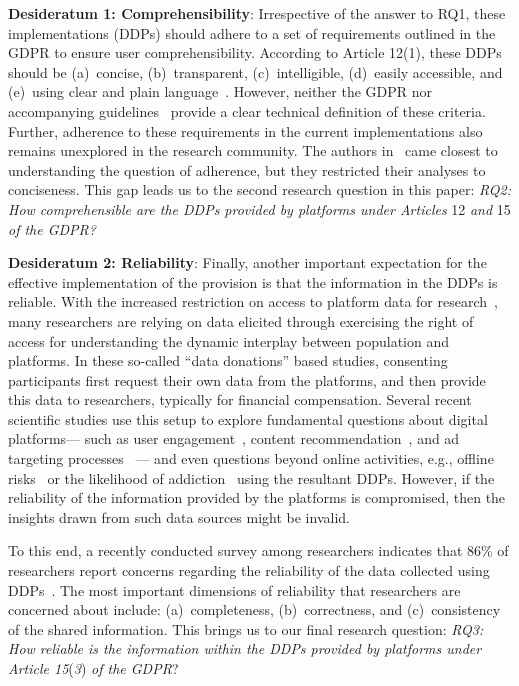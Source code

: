 \noindent
\textbf{Desideratum 1: Comprehensibility}: Irrespective of the answer to RQ1, these implementations (DDPs) should adhere to a set of requirements outlined in the GDPR to ensure user comprehensibility.
According to Article 12(1), these DDPs should be (a)~concise, (b)~transparent, (c)~intelligible, (d)~easily accessible, and (e)~using clear and plain language~\cite{EU2016GDPR}.
However, neither the GDPR nor accompanying guidelines~\cite{EDPB2018Transparency} provide a clear technical definition of these criteria.
Further, adherence to these requirements in the current implementations also remains unexplored in the research community.
The authors in~\cite{borem2024data} came closest to understanding the question of adherence, but they restricted their analyses to conciseness.
This gap leads us to the second research question in this paper: \textit{RQ2: How comprehensible are the DDPs provided by platforms under Articles} 12 \textit{and} 15 \textit{of the GDPR?}

\noindent
\textbf{Desideratum 2: Reliability}: Finally, another important expectation for the effective implementation of the provision is that the information in the DDPs is reliable.
With the increased restriction on access to platform data for research~\cite{Stokel-Walker2023Twitter, Bellan2024Meta}, many researchers are relying on data elicited through exercising the right of access for understanding the dynamic interplay between population and platforms. 
In these so-called ``data donations'' based studies, consenting participants first request their own data from the platforms, and then provide this data to researchers, typically for financial compensation. 
Several recent scientific studies use this setup to explore fundamental questions about digital platforms— such as user engagement~\cite{zannettou2024analyzing}, content recommendation~\cite{vombatkere2024tiktok}, and ad targeting processes~\cite{wei2020twitter} — and even questions beyond online activities, e.g., offline risks~\cite{alsoubai2024profiling} or the likelihood of addiction~\cite{yang2024coupling} using the resultant DDPs. 
However, if the reliability of the information provided by the platforms is compromised, then the insights drawn from such data sources might be invalid.

To this end, a recently conducted survey among researchers indicates that 86\% of researchers report concerns regarding the reliability of the data collected using DDPs~\cite{valkenburg2024time}.
The most important dimensions of reliability that researchers are concerned about include: (a)~completeness, (b)~correctness, and (c)~consistency of the shared information.
This brings us to our final research question: \textit{ RQ3: How reliable is the information within the DDPs provided by platforms under Article 15}(\textit{3}) \textit{of the GDPR}?

